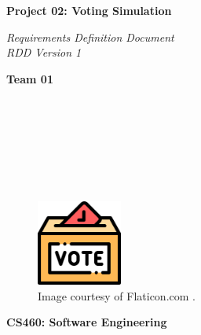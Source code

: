 \documentclass{article}
\begin{document}
\begin{titlepage}
\begin{center}
\vspace*{1cm}

\Huge
\textbf{Project 02: Voting Simulation}

\vspace{0.5cm}
\Large
\textit{Requirements Definition Document} \\
\textit{RDD Version 1}

\vspace{1cm}

\textbf{Team 01}

\vspace{0.5cm}

 \\
 \\
 \\
 \\
 \\
 \\

\vspace{1cm}

\begin{figure}[h]
    \centering
    \includegraphics[width=0.25\textwidth]{docs/rdd/figures/ballot_icon.png}
    \caption*{Image courtesy of Flaticon.com \cite{flaticonElectionsFree}.}
    \label{fig:safeIcon}
\end{figure}

\vspace{7cm}

\Large
\textbf{CS460: Software Engineering} \\

\end{center}
\end{titlepage}

\newpage

\tableofcontents

\newpage
\end{document}
